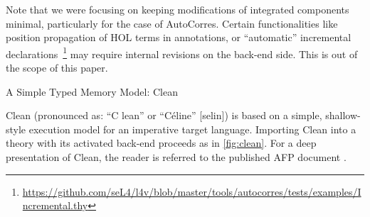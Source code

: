 \begin{isabellebody}
\begin{isamarkuptext}
Note that we were focusing on keeping modifications of integrated components minimal, particularly
for the case of AutoCorres. Certain functionalities like position propagation of HOL terms in
annotations, or ``automatic'' incremental declarations~\footnote{\url{https://github.com/seL4/l4v/blob/master/tools/autocorres/tests/examples/Incremental.thy}}
may require internal revisions on the back-end side. This is out of the scope of this paper.%
\end{isamarkuptext}\isamarkuptrue%
%
\begin{isamarkupsubsection*}%
[label = {clean},type = {scholarly_paper.technical}, args={label = {clean},type = {scholarly_paper.technical}, Isa_COL.text_element.level = {}, Isa_COL.text_element.referentiable = {False}, Isa_COL.text_element.variants = {{STR ''outline'', STR ''document''}}, scholarly_paper.text_section.main_author = {}, scholarly_paper.text_section.fixme_list = {}, Isa_COL.text_element.level = {}, scholarly_paper.technical.definition_list = {}}]A Simple Typed Memory Model: Clean%
\end{isamarkupsubsection*}\isamarkuptrue%
%
\begin{isamarkuptext}%
Clean (pronounced as: ``C lean'' or ``Céline'' [selin]) is based on a simple,
shallow-style execution model for an imperative target language.
Importing Clean into a theory with its activated back-end proceeds as in \autoref{fig:clean}.
For a deep presentation of Clean, the reader is referred to the published AFP document \cite{journals/afp/TuongW19}.


\end{isamarkuptext}
\end{isabellebody}
